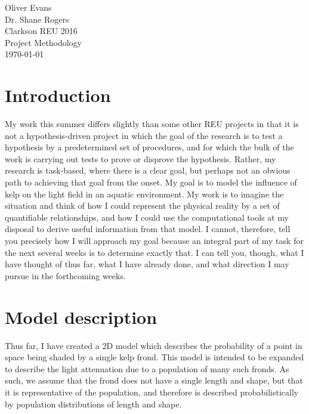 \documentclass{article}
\begin{document}
\noindent
Oliver Evans \\
Dr. Shane Rogers  \\
Clarkson REU 2016 \\
Project Methodology \\
\today \\[-0.75em]

\begin{multicols}{2}

\section{Introduction}
My work this summer differs slightly than some other REU projects in that it is not a hypothesis-driven project in which the goal of the research is to test a hypothesis by a predetermined set of procedures, and for which the bulk of the work is carrying out tests to prove or disprove the hypothesis.
 Rather, my research is task-based, where there is a clear goal, but perhaps not an obvious path to achieving that goal from the onset.
 My goal is to model the influence of kelp on the light field in an aquatic environment.
 My work is to imagine the situation and think of how I could represent the physical reality by a set of quantifiable relationships, and how I could use the computational tools at my disposal to derive useful information from that model.
 I cannot, therefore, tell you precisely how I will approach my goal because an integral part of my task for the next several weeks is to determine exactly that.
 I can tell you, though, what I have thought of thus far, what I have already done, and what direction I may pursue in the forthcoming weeks.

\section{Model description}
Thus far, I have created a 2D model which describes the probability of a point in space being shaded by a single kelp frond.
 This model is intended to be expanded to describe the light attenuation due to a population of many such fronds.
 As such, we assume that the frond does not have a single length and shape, but that it is representative of the population, and therefore is described probabilistically by population distributions of length and shape.


\end{multicols}
\end{document}
